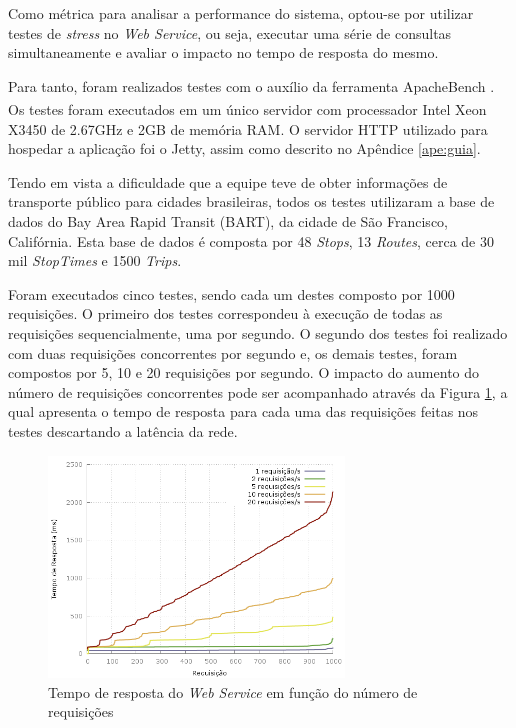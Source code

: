 Como métrica para analisar a performance do sistema, optou-se por utilizar testes de \emph{stress} no \emph{Web Service}, ou seja, executar uma série de consultas simultaneamente e avaliar o impacto no tempo de resposta do mesmo.

Para tanto, foram realizados testes com o auxílio da ferramenta ApacheBench \cite{apachebench}.
Os testes foram executados em um único servidor com processador Intel{\textsuperscript\textregistered} Xeon{\textsuperscript\textregistered} X3450 de 2.67GHz e 2GB de memória RAM.
O servidor HTTP utilizado para hospedar a aplicação foi o Jetty, assim como descrito no Apêndice \ref{ape:guia}.

Tendo em vista a dificuldade que a equipe teve de obter informações de transporte público para cidades brasileiras, todos os testes utilizaram a base de dados do Bay Area Rapid Transit (BART), da cidade de São Francisco, Califórnia.
Esta base de dados é composta por 48 \emph{Stops}, 13 \emph{Routes}, cerca de 30 mil \emph{StopTimes} e 1500 \emph{Trips}.

Foram executados cinco testes, sendo cada um destes composto por 1000 requisições.
O primeiro dos testes correspondeu à execução de todas as requisições sequencialmente, uma por segundo.
O segundo dos testes foi realizado com duas requisições concorrentes por segundo e, os demais testes, foram compostos por 5, 10 e 20 requisições por segundo.
O impacto do aumento do número de requisições concorrentes pode ser acompanhado através da Figura \ref{fig:response}, a qual apresenta o tempo de resposta para cada uma das requisições feitas nos testes descartando a latência da rede.

\begin{figure}[!htb]
	\centering
	\includegraphics[width=0.7\textwidth]{./plots/stresstests/out.png}
	\caption[Tempo de resposta do \emph{Web Service}]{Tempo de resposta do \emph{Web Service} em função do número de requisições}
	\label{fig:response}
\end{figure}

